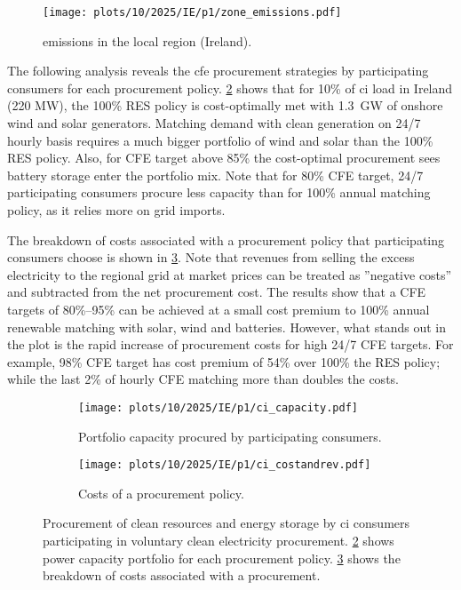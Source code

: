 \begin{figure}
    \centering
    \texttt{[image: plots/10/2025/IE/p1/zone\_emissions.pdf]}
    \caption{\co emissions in the local region (Ireland).}
    \label{fig:10-2025-IE-p1-zone_emissions}
\end{figure}

The following analysis reveals the \gls{cfe} procurement strategies by participating consumers for each procurement policy.
\cref{fig:10-2025-IE-p1-ci_capacity} shows that for 10\% of \gls{ci} load in Ireland (220 MW), the 100\% RES policy is cost-optimally met with 1.3~GW of onshore wind and solar generators.
Matching demand with clean generation on 24/7 hourly basis requires a much bigger portfolio of wind and solar than the 100\% RES policy.
Also, for CFE target above 85\% the cost-optimal procurement sees battery storage enter the portfolio mix.
Note that for 80\% CFE target, 24/7 participating consumers procure less capacity than for 100\% annual matching policy, as it relies more on grid imports.

The breakdown of costs associated with a procurement policy that participating consumers choose is shown in \cref{fig:10-2025-IE-p1-ci_costandrev}.
Note that revenues from selling the excess electricity to the regional grid at market prices can be treated as ”negative costs” and subtracted from the net procurement cost.
The results show that a CFE targets of 80\%--95\% can be achieved at a small cost premium to 100\% annual renewable matching with solar, wind and batteries.
However, what stands out in the plot is the rapid increase of procurement costs for high 24/7 CFE targets. 
For example, 98\% CFE target has cost premium of 54\% over 100\% the RES policy; while the last 2\% of hourly CFE matching more than doubles the costs.

\begin{figure}
    \centering
    \begin{subfigure}[t]{0.95\columnwidth}
        \centering
        \caption{Portfolio capacity procured by participating consumers.}
        \texttt{[image: plots/10/2025/IE/p1/ci\_capacity.pdf]}
        \label{fig:10-2025-IE-p1-ci_capacity}
    \end{subfigure}
    \begin{subfigure}[t]{0.95\columnwidth}
        \centering
        \vspace{-0.5cm}
        \caption{Costs of a procurement policy.}
        \texttt{[image: plots/10/2025/IE/p1/ci\_costandrev.pdf]}
        \label{fig:10-2025-IE-p1-ci_costandrev}
    \end{subfigure}
    \caption{Procurement of clean resources and energy storage by \gls{ci} consumers participating in voluntary clean electricity procurement. 
    \cref{fig:10-2025-IE-p1-ci_capacity} shows power capacity portfolio for each procurement policy.
    \cref{fig:10-2025-IE-p1-ci_costandrev} shows the breakdown of costs associated with a procurement.}
    \label{fig:10-2025-IE-p1-ci_procurement}
\end{figure}


